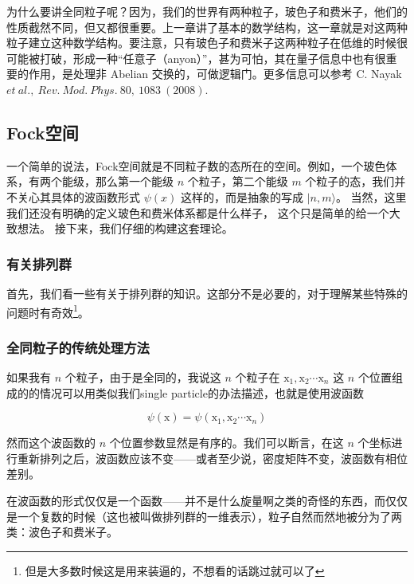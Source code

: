 
为什么要讲全同粒子呢？因为，我们的世界有两种粒子，玻色子和费米子，他们的性质截然不同，但又都很重要。上一章讲了基本的数学结构，这一章就是对这两种粒子建立这种数学结构。要注意，只有玻色子和费米子这两种粒子在低维的时候很可能被打破，形成一种“任意子（anyon）”，甚为可怕，其在量子信息中也有很重要的作用，是处理非 Abelian 交换的，可做逻辑门。更多信息可以参考 C. Nayak $et\ al.,\ Rev.\ Mod.\ Phys.\ 80,\ 1083\ (2008)$.

\subsection{Fock空间}

一个简单的说法，Fock空间就是不同粒子数的态所在的空间。例如，一个玻色体系，有两个能级，那么第一个能级 $n$ 个粒子，第二个能级 $m$ 个粒子的态，我们并不关心其具体的波函数形式 $\psi(x)$ 这样的，而是抽象的写成 $|n,m\rangle$。 当然，这里我们还没有明确的定义玻色和费米体系都是什么样子， 这个只是简单的给一个大致想法。 接下来，我们仔细的构建这套理论。

\subsubsection{有关排列群}

首先，我们看一些有关于排列群的知识。这部分不是必要的，对于理解某些特殊的问题时有奇效\footnote{但是大多数时候这是用来装逼的，不想看的话跳过就可以了}。

\subsubsection{全同粒子的传统处理方法}

如果我有 $n$ 个粒子，由于是全同的，我说这 $n$ 个粒子在 ${\mathrm x}_1, {\mathrm x}_2 \cdots {\mathrm x}_n$ 这 $n$ 个位置组成的的情况可以用类似我们single particle的办法描述，也就是使用波函数

\begin{equation}
\psi({\mathrm x}) = \psi({\mathrm x}_1, {\mathrm x}_2\cdots{\mathrm x}_n)
\end{equation}

然而这个波函数的 $n$ 个位置参数显然是有序的。我们可以断言，在这 $n$ 个坐标进行重新排列之后，波函数应该不变——或者至少说，密度矩阵不变，波函数有相位差别。

在波函数的形式仅仅是一个函数——并不是什么旋量啊之类的奇怪的东西，而仅仅是一个复数的时候（这也被叫做排列群的一维表示），粒子自然而然地被分为了两类：波色子和费米子。

